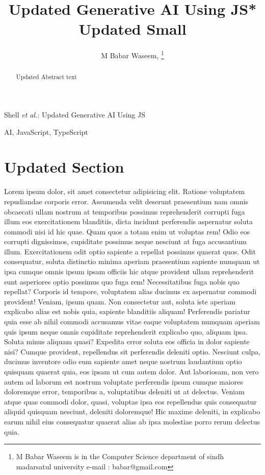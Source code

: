 \documentclass[journal,lettersize]{IEEEtran}%
\begin{document}
%
\normalsize%
\title{Updated Generative AI Using JS*\\
    {\footnotesize Updated Small}
    }%
\author{M Babar Waseem,
\thanks{M Babar Waseem is in the Computer Science department of sindh madarsatul university e-mail : babar@gmail.com}}%
%
{Shell \MakeLowercase{\textit{et al.}}: Updated Generative AI Using JS}%
\maketitle%
\begin{abstract}%
Updated Abstract text%
\end{abstract}%
\begin{IEEEkeywords}%
AI, JavaScript, TypeScript%
\end{IEEEkeywords}%
\section{Updated Section}%
\label{sec:UpdatedSection}%
%
Lorem ipsum dolor, sit amet consectetur adipisicing elit. Ratione voluptatem repudiandae corporis error. Assumenda velit deserunt praesentium nam omnis obcaecati ullam nostrum at temporibus possimus reprehenderit corrupti fuga illum eos exercitationem blanditiis, dicta incidunt perferendis aspernatur soluta commodi nisi id hic quae. Quam quos a totam enim ut voluptas rem! Odio eos corrupti dignissimos, cupiditate possimus neque nesciunt at fuga accusantium illum. Exercitationem odit optio sapiente a repellat possimus quaerat quos. Odit consequatur, soluta distinctio minima aperiam praesentium sapiente numquam ut ipsa cumque omnis ipsum ipsam officiis hic atque provident ullam reprehenderit sunt asperiores optio possimus quo fuga rem! Necessitatibus fuga nobis quo repellat? Corporis id tempore, voluptatem alias ducimus ex aspernatur commodi provident! Veniam, ipsum quam. Non consectetur aut, soluta iste aperiam explicabo alias est nobis quia, sapiente blanditiis aliquam! Perferendis pariatur quia esse ab nihil commodi accusamus vitae eaque voluptatem numquam aperiam quis ipsum neque omnis cupiditate reprehenderit explicabo quo, aliquam ipsa. Soluta minus aliquam quasi? Expedita error soluta eos officia in dolor sapiente nisi? Cumque provident, repellendus sit perferendis deleniti optio. Nesciunt culpa, ducimus inventore odio eum sapiente amet neque nostrum laudantium optio quisquam quaerat quia, eos ipsam ut cum autem dolor. Aut laboriosam, non vero autem ad laborum est nostrum voluptate perferendis ipsum cumque maiores doloremque error, temporibus a, voluptatibus deleniti ut at delectus. Veniam atque quas commodi dolor, quasi, voluptas ipsa eos repellendus quis consequatur aliquid quisquam nesciunt, deleniti doloremque! Hic maxime deleniti, in explicabo earum nihil eius consequatur quaerat alias ab ipsa molestiae porro rerum delectus quia.
\end{document}
